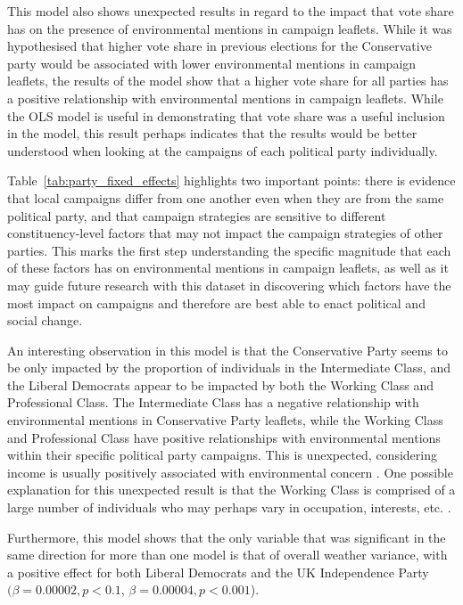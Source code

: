 \documentclass[preprint,12pt,authoryear]{elsarticle}
\begin{document}
This model also shows unexpected results in regard to the impact that vote share has on the presence of environmental mentions in campaign leaflets. While it was hypothesised that higher vote share in previous elections for the Conservative party would be associated with lower environmental mentions in campaign leaflets, the results of the model show that a higher vote share for all parties has a positive relationship with environmental mentions in campaign leaflets. While the OLS model is useful in demonstrating that vote share was a useful inclusion in the model, this result perhaps indicates that the results would be better understood when looking at the campaigns of each political party individually.

Table~\ref{tab:party_fixed_effects} highlights two important points: there is evidence that local campaigns differ from one another even when they are from the same political party, and that campaign strategies are sensitive to different constituency-level factors that may not impact the campaign strategies of other parties. This marks the first step understanding the specific magnitude that each of these factors has on environmental mentions in campaign leaflets, as well as it may guide future research with this dataset in discovering which factors have the most impact on campaigns and therefore are best able to enact political and social change.

An interesting observation in this model is that the Conservative Party seems to be only impacted by the proportion of individuals in the Intermediate Class, and the Liberal Democrats appear to be impacted by both the Working Class and Professional Class. The Intermediate Class has a negative relationship with environmental mentions in Conservative Party leaflets, while the Working Class and Professional Class have positive relationships with environmental mentions within their specific political party campaigns. This is unexpected, considering income is usually positively associated with environmental concern \citep{liu2024personal}. One possible explanation for this unexpected result is that the Working Class is comprised of a large number of individuals who may perhaps vary in occupation, interests, etc. \citep{le2008class}.

Furthermore, this model shows that the only variable that was significant in the same direction for more than one model is that of overall weather variance, with a positive effect for both Liberal Democrats and the UK Independence Party \((\beta = 0.00002, p < 0.1\), \(\beta = 0.00004, p < 0.001\)).
\end{document}
